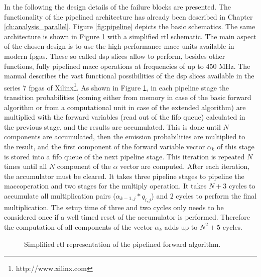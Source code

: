 \documentclass[mscthesis]{usiinfthesis}
\begin{document}
In the following the design details of the failure blocks are presented.
The functionality of the pipelined architecture has already been described in
Chapter \ref{ch:analysis_parallel}. Figure \ref{fig:pipeline} depicts the
basic schematics. The same architecture is shown in Figure \ref{fig:arch_pipe}
with a simplified \gls{rtl} schematic. The main aspect of the chosen design is
to use the high performance \gls{macc} units available in modern \glspl{fpga}.
These so called \gls{dsp} slices allow to perform, besides other functions,
fully pipelined \gls{macc} operations at frequencies of up to 450 MHz. The
manual \cite{xilinx_DSP} describes the vast functional possibilities of the
\gls{dsp} slices available in the series 7 \glspl{fpga} of
Xilinx\footnote{http://www.xilinx.com}. As shown in Figure \ref{fig:arch_pipe},
in each pipeline stage the transition probabilities (coming either from memory
in case of the basic forward algorithm or from a computational unit in case
of the extended algorithm) are multiplied with the forward variables (read out
of the \gls{fifo} queue) calculated in the previous stage, and the results are
accumulated. This is done until $N$ components are accumulated, then the
emission probabilities are multiplied to the result, and the first component of
the forward variable vector $\alpha_k$ of this stage is stored into a \gls{fifo}
queue of the next pipeline stage. This iteration is repeated $N$ times until
all $N$ component of the $\alpha$ vector are computed. After each iteration,
the accumulator must be cleared. It takes three pipeline stages to pipeline the
\gls{macc}operation and two stages for the multiply operation. It takes $N+3$
cycles to accumulate all multiplication pairs ($\alpha_{k-1, j} * q_{i,j}$) and
$2$ cycles to perform the final multiplication. The setup time of three and two
cycles only needs to be considered once if a well timed reset of the
accumulator is performed. Therefore the computation of all components of the
vector $\alpha_k$ adds up to $N^2+5$ cycles.
\begin{figure}
    \centering
    
    \caption{Simplified \acrshort{rtl} representation of the pipelined forward
        algorithm.}
    \label{fig:arch_pipe}
\end{figure}
\end{document}
